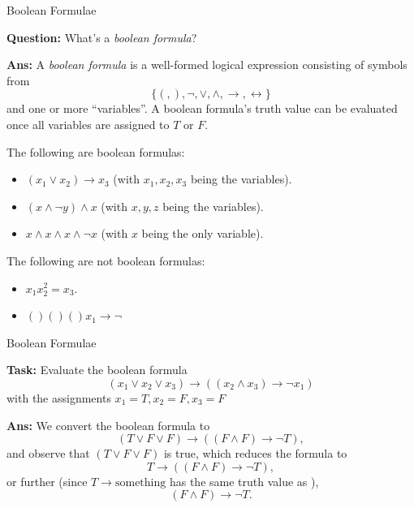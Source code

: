 \documentclass{beamer}
\begin{document}
\begin{frame}{Boolean Formulae}

\textbf{Question:} What's a \textit{boolean formula}?

\pause

\textbf{Ans:} A \textit{boolean formula} is a well-formed logical expression consisting of symbols from $$\{(, ), \neg, \lor, \land, \rightarrow, \leftrightarrow\}$$
and one or more ``variables''. A boolean formula's truth value can be evaluated once all variables are assigned to $T$ or $F$.

\pause \vspace{2mm}

The following are boolean formulas:
\begin{itemize}
    \item $(x_1 \lor x_2) \rightarrow x_3$ (with $x_1, x_2, x_3$ being the variables).
    \item $(x \land \neg y) \land x$ (with $x, y, z$ being the variables).
    \item $x \land x \land x \land \neg x$ (with $x$ being the only variable).
\end{itemize}

\pause \vspace{2mm}

The following are not boolean formulas:
\begin{itemize}
    \item $x_1 x_2^2 = x_3$.
    \item $()()()x_1 \rightarrow \neg$
\end{itemize}

\end{frame}

\begin{frame}{Boolean Formulae}

\textbf{Task:} Evaluate the boolean formula
$$(x_1 \lor x_2 \lor x_3) \rightarrow ((x_2 \land x_3) \rightarrow \neg x_1)$$
with the assignments $x_1 = T, x_2 = F, x_3 = F$

\pause \vspace{2mm}
\textbf{Ans:} We convert the boolean formula to
$$(T \lor F \lor F) \rightarrow ((F \land F) \rightarrow \neg T),$$
and observe that $(T \lor F \lor F)$ is true, which reduces the formula to
$$T \rightarrow ((F \land F) \rightarrow \neg T),$$
or further (since $T \rightarrow \text{something}$ has the same truth value as ),
$$(F \land F) \rightarrow \neg T.$$


\end{frame}
\end{document}
